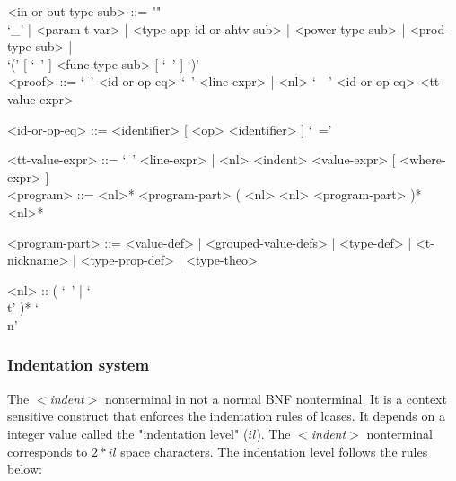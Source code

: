 \documentclass{article}
\begin{document}
\begin{grammar}
<in-or-out-type-sub> ::= ""\\
`_' | <param-t-var> | <type-app-id-or-ahtv-sub> | <power-type-sub> |
<prod-type-sub> | \\`(' [ `\ ' ] <func-type-sub> [ `\ ' ] `)'
\\

<proof> ::=
`\ ' <id-or-op-eq> `\ ' <line-expr> |
<nl> `\ \ ' <id-or-op-eq>  <tt-value-expr>

<id-or-op-eq> ::= <identifier> [ <op> <identifier> ] `\ ='

<tt-value-expr> ::=
`\ ' <line-expr> | <nl> <indent> <value-expr> [ <where-expr> ]
\\

<program> ::=
<nl>* <program-part> ( <nl> <nl> <program-part> )* <nl>*

<program-part> ::=
<value-def> | <grouped-value-defs> | <type-def> | <t-nickname> |
<type-prop-def> | <type-theo>

<nl> :: ( `\ ' | `\\t' )* `\\n'
\end{grammar}

\newpage

\subsubsection{Indentation system}
\label{subsubsec:indsys}

The \textit{$<$indent$>$} nonterminal in not a normal BNF nonterminal. It is a
context sensitive construct that enforces the indentation rules of lcases.
It depends on a integer value called the "indentation level" ($il$).
The \textit{$<$indent$>$} nonterminal corresponds to $2*il$ space characters.
The indentation level follows the rules below:
\end{document}
